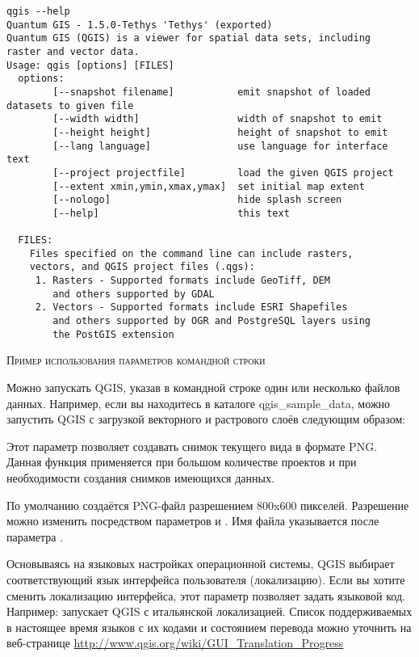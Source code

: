 \small
\begin{verbatim}
qgis --help
Quantum GIS - 1.5.0-Tethys 'Tethys' (exported)
Quantum GIS (QGIS) is a viewer for spatial data sets, including
raster and vector data.
Usage: qgis [options] [FILES]
  options:
        [--snapshot filename]           emit snapshot of loaded datasets to given file
        [--width width]                 width of snapshot to emit
        [--height height]               height of snapshot to emit
        [--lang language]               use language for interface text
        [--project projectfile]         load the given QGIS project
        [--extent xmin,ymin,xmax,ymax]  set initial map extent
        [--nologo]                      hide splash screen
        [--help]                        this text

  FILES:
    Files specified on the command line can include rasters,
    vectors, and QGIS project files (.qgs):
     1. Rasters - Supported formats include GeoTiff, DEM
        and others supported by GDAL
     2. Vectors - Supported formats include ESRI Shapefiles
        and others supported by OGR and PostgreSQL layers using
        the PostGIS extension
\end{verbatim}
\normalsize

\begin{Tip} \caption{\textsc{Пример использования параметров командной строки}}
Можно запускать QGIS, указав в командной строке один или несколько файлов
данных. Например, если вы находитесь в каталоге qgis\_sample\_data,
можно запустить QGIS с загрузкой векторного и растрового
слоёв следующим образом: \\
\end{Tip}

Этот параметр позволяет создавать снимок текущего вида в формате PNG. Данная
функция применяется при большом количестве проектов и при необходимости
создания снимков имеющихся данных.

По умолчанию создаётся PNG-файл разрешением 800x600 пикселей. Разрешение
можно изменить посредством параметров
 и . Имя файла указывается после параметра
.

Основываясь на языковых настройках операционной системы, QGIS выбирает
соответствующий язык интерфейса пользователя (локализацию). Если вы хотите
сменить локализацию интерфейса, этот параметр позволяет задать языковой код. Например:
 запускает QGIS с итальянской локализацией. Список
поддерживаемых в настоящее время языков с их кодами и состоянием перевода можно
уточнить на веб-странице
\url{http://www.qgis.org/wiki/GUI_Translation_Progress}

